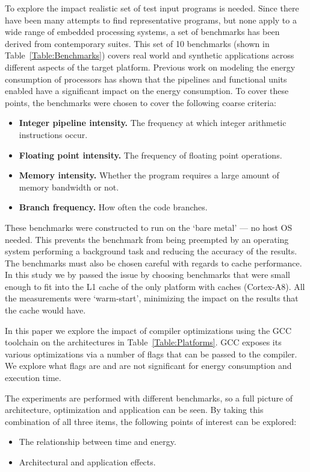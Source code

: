 \documentclass[twocolumn]{article}
\begin{document}
To explore the impact  realistic set of test input programs is needed. Since there have been many attempts to find representative programs, but none apply to a wide range of embedded processing systems, a set of benchmarks has been derived from contemporary suites. This set of 10 benchmarks (shown in Table~\ref{Table:Benchmarks}) covers real world and synthetic applications across different aspects of the target platform. Previous work on modeling the energy consumption of processors has shown that the pipelines and functional units enabled have a significant impact on the energy consumption. To cover these points, the benchmarks were chosen to cover the following coarse criteria:
\begin{itemize}
	\setlength{\itemsep}{0em}
	\vspace{-1mm}
	\item \textbf{Integer pipeline intensity.} The frequency at which integer arithmetic instructions occur.
	\item \textbf{Floating point intensity.} The frequency of floating point operations.
	\item \textbf{Memory intensity.} Whether the program requires a large amount of memory bandwidth or not.
	\item \textbf{Branch frequency.} How often the code branches.
\end{itemize}

These benchmarks were constructed to run on the `bare metal' --- no host OS needed. This prevents the benchmark from being preempted by an operating system performing a background task and reducing the accuracy of the results. The benchmarks must also be chosen careful with regards to cache performance. In this study we by passed the issue by choosing benchmarks that were small enough to fit into the L1 cache of the only platform with caches (Cortex-A8). All the measurements were `warm-start', minimizing the impact on the results that the cache would have.

In this paper we explore the impact of compiler optimizations using the GCC toolchain on the architectures in Table~\ref{Table:Platforms}. GCC exposes its various optimizations via a number of flags that can be passed to the compiler. We explore what flags are and are not significant for energy consumption and execution time.

The experiments are performed with different benchmarks, so a full picture of architecture, optimization and application can be seen. By taking this combination of all three items, the following points of interest can be explored:
\begin{itemize}
	\setlength{\itemsep}{0em}
	\vspace{-1mm}
 	\item The relationship between time and energy.
 	\item Architectural and application effects.
 \end{itemize}
\end{document}
